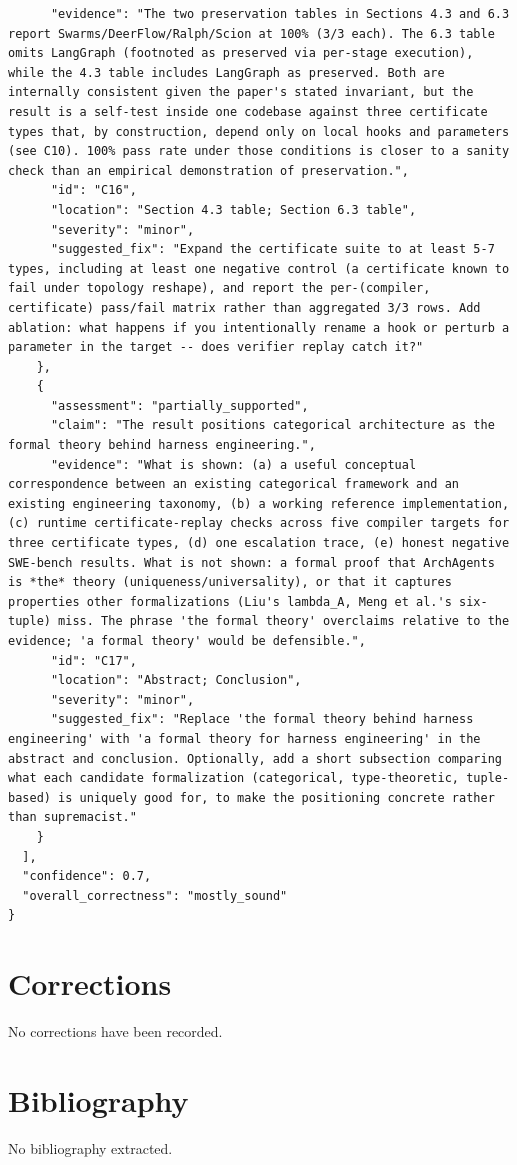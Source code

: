 \documentclass[11pt]{article}
\begin{document}
\begin{verbatim}
      "evidence": "The two preservation tables in Sections 4.3 and 6.3 report Swarms/DeerFlow/Ralph/Scion at 100% (3/3 each). The 6.3 table omits LangGraph (footnoted as preserved via per-stage execution), while the 4.3 table includes LangGraph as preserved. Both are internally consistent given the paper's stated invariant, but the result is a self-test inside one codebase against three certificate types that, by construction, depend only on local hooks and parameters (see C10). 100% pass rate under those conditions is closer to a sanity check than an empirical demonstration of preservation.",
      "id": "C16",
      "location": "Section 4.3 table; Section 6.3 table",
      "severity": "minor",
      "suggested_fix": "Expand the certificate suite to at least 5-7 types, including at least one negative control (a certificate known to fail under topology reshape), and report the per-(compiler, certificate) pass/fail matrix rather than aggregated 3/3 rows. Add ablation: what happens if you intentionally rename a hook or perturb a parameter in the target -- does verifier replay catch it?"
    },
    {
      "assessment": "partially_supported",
      "claim": "The result positions categorical architecture as the formal theory behind harness engineering.",
      "evidence": "What is shown: (a) a useful conceptual correspondence between an existing categorical framework and an existing engineering taxonomy, (b) a working reference implementation, (c) runtime certificate-replay checks across five compiler targets for three certificate types, (d) one escalation trace, (e) honest negative SWE-bench results. What is not shown: a formal proof that ArchAgents is *the* theory (uniqueness/universality), or that it captures properties other formalizations (Liu's lambda_A, Meng et al.'s six-tuple) miss. The phrase 'the formal theory' overclaims relative to the evidence; 'a formal theory' would be defensible.",
      "id": "C17",
      "location": "Abstract; Conclusion",
      "severity": "minor",
      "suggested_fix": "Replace 'the formal theory behind harness engineering' with 'a formal theory for harness engineering' in the abstract and conclusion. Optionally, add a short subsection comparing what each candidate formalization (categorical, type-theoretic, tuple-based) is uniquely good for, to make the positioning concrete rather than supremacist."
    }
  ],
  "confidence": 0.7,
  "overall_correctness": "mostly_sound"
}
\end{verbatim}

\section*{Corrections}
No corrections have been recorded.

\section*{Bibliography}
No bibliography extracted.

% 
% 
\end{document}
